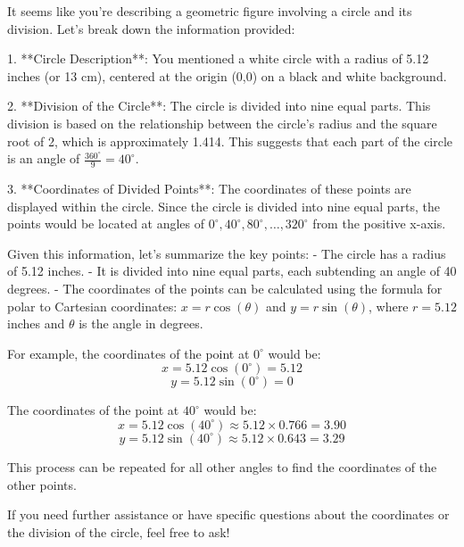 It seems like you're describing a geometric figure involving a circle and its division. Let's break down the information provided:

1. **Circle Description**: You mentioned a white circle with a radius of 5.12 inches (or 13 cm), centered at the origin (0,0) on a black and white background.

2. **Division of the Circle**: The circle is divided into nine equal parts. This division is based on the relationship between the circle's radius and the square root of 2, which is approximately 1.414. This suggests that each part of the circle is an angle of \( \frac{360^\circ}{9} = 40^\circ \).

3. **Coordinates of Divided Points**: The coordinates of these points are displayed within the circle. Since the circle is divided into nine equal parts, the points would be located at angles of \( 0^\circ, 40^\circ, 80^\circ, \ldots, 320^\circ \) from the positive x-axis.

Given this information, let's summarize the key points:
- The circle has a radius of 5.12 inches.
- It is divided into nine equal parts, each subtending an angle of 40 degrees.
- The coordinates of the points can be calculated using the formula for polar to Cartesian coordinates: \( x = r \cos(\theta) \) and \( y = r \sin(\theta) \), where \( r = 5.12 \) inches and \( \theta \) is the angle in degrees.

For example, the coordinates of the point at \( 0^\circ \) would be:
\[ x = 5.12 \cos(0^\circ) = 5.12 \]
\[ y = 5.12 \sin(0^\circ) = 0 \]

The coordinates of the point at \( 40^\circ \) would be:
\[ x = 5.12 \cos(40^\circ) \approx 5.12 \times 0.766 = 3.90 \]
\[ y = 5.12 \sin(40^\circ) \approx 5.12 \times 0.643 = 3.29 \]

This process can be repeated for all other angles to find the coordinates of the other points.

If you need further assistance or have specific questions about the coordinates or the division of the circle, feel free to ask!